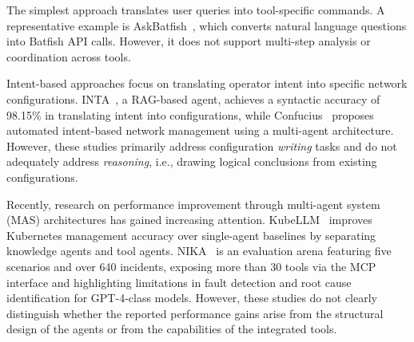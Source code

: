 The simplest approach translates user queries into tool-specific commands.
A representative example is AskBatfish~\cite{ref16}, which converts natural language questions into Batfish API calls. However, it does not support multi-step analysis or coordination across tools.

Intent-based approaches focus on translating operator intent into specific network configurations.
INTA~\cite{ref13}, a RAG-based agent, achieves a syntactic accuracy of 98.15\% in translating intent into configurations, while Confucius~\cite{ref15} proposes automated intent-based network management using a multi-agent architecture.
However, these studies primarily address configuration \emph{writing} tasks and do not adequately address \emph{reasoning}, i.e., drawing logical conclusions from existing configurations.





Recently, research on performance improvement through multi-agent system (MAS) architectures has gained increasing attention.
KubeLLM~\cite{ref14} improves Kubernetes management accuracy over single-agent baselines by separating knowledge agents and tool agents.
NIKA~\cite{wang2025network_arena} is an evaluation arena featuring five scenarios and over 640 incidents, exposing more than 30 tools via the MCP interface and highlighting limitations in fault detection and root cause identification for GPT-4-class models.
However, these studies do not clearly distinguish whether the reported performance gains arise from the structural design of the agents or from the capabilities of the integrated tools.


